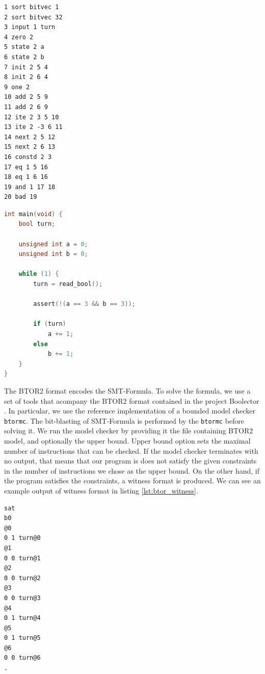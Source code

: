 \documentclass[12pt]{article}
\begin{document}
\noindent\begin{minipage}{.45\textwidth}
\begin{lstlisting}[label=lst:btor2_example, caption={Example BTOR2 model},captionpos=b]
1 sort bitvec 1
2 sort bitvec 32
3 input 1 turn
4 zero 2
5 state 2 a
6 state 2 b
7 init 2 5 4
8 init 2 6 4
9 one 2
10 add 2 5 9
11 add 2 6 9
12 ite 2 3 5 10
13 ite 2 -3 6 11
14 next 2 5 12
15 next 2 6 13
16 constd 2 3
17 eq 1 5 16
18 eq 1 6 16
19 and 1 17 18
20 bad 19
\end{lstlisting}
\end{minipage}\hfill
\begin{minipage}{.5\textwidth}
\begin{lstlisting}[label=lst:c_code, language=c, caption={Corresponding code for the model},captionpos=b]
int main(void) {
    bool turn;

    unsigned int a = 0;
    unsigned int b = 0;

    while (1) {
        turn = read_bool();

        assert(!(a == 3 && b == 3));

        if (turn)
            a += 1;
        else
            b += 1;
    }
}
\end{lstlisting}
\end{minipage}

The BTOR2 format encodes the SMT-Formula. To solve the formula, we use a set of
tools that acompany the BTOR2 format contained in the project Boolector
\cite{DBLP:journals/jsat/NiemetzPB14}. In particular, we use the reference
implementation of a bounded model checker \texttt{btormc}. The bit-blasting of 
SMT-Formula is performed by the \texttt{btormc} before solving it. We run the
model checker by providing it the file containing BTOR2 model, and optionally
the upper bound. Upper bound option sets the maximal number of instructions
that can be checked. If the model checker terminates with no output, that means
that our program is does not satisfy the given constraints in the number of
instructions we chose as the upper bound. On the other hand, if the program
satisfies the constraints, a witness format is produced. We can see an example
output of witness format in listing \ref{lst:btor_witness}.

\begin{lstlisting}[label=btor_witness, caption={BTOR2 Witness Format for model in listing \ref{lst:btor2_example}}, captionpos=b]
sat
b0
@0
0 1 turn@0
@1
0 0 turn@1
@2
0 0 turn@2
@3
0 0 turn@3
@4
0 1 turn@4
@5
0 1 turn@5
@6
0 0 turn@6
.
\end{lstlisting}
\end{document}
